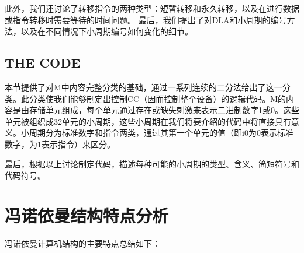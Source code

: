 \documentclass[12pt]{article} %
\theoremstyle{definition}
\begin{document}
此外，我们还讨论了转移指令的两种类型：短暂转移和永久转移，以及在进行数据或指令转移时需要等待的时间问题。
最后，我们提出了对DLA和小周期的编号方法，以及在不同情况下小周期编号如何变化的细节。

\subsection{THE CODE}

本节提供了对M中内容完整分类的基础，通过一系列连续的二分法给出了这一分类。此分类使我们能够制定出控制CC（因而控制整个设备）的逻辑代码。M的内容是由存储单元组成，每个单元通过存在或缺失刺激来表示二进制数字1或0。这些单元被组织成32单元的小周期，这些小周期在我们将要介绍的代码中将直接具有意义。小周期分为标准数字和指令两类，通过其第一个单元的值（即i0为0表示标准数字，为1表示指令）来区分。

最后，根据以上讨论制定代码，描述每种可能的小周期的类型、含义、简短符号和代码符号。

\section{冯诺依曼结构特点分析}

冯诺依曼计算机结构的主要特点总结如下\cite{vonNeumann1945edvac}：
\end{document}
